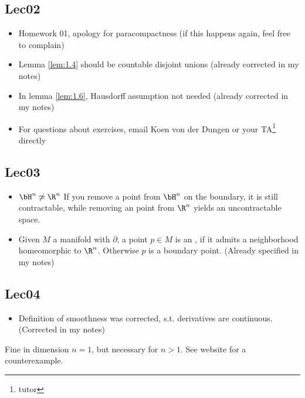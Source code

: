 \subsection*{Lec02}
\begin{itemize}
    \item Homework 01, apology for paracompactness (if this happens again, feel free to complain)
    \item Lemma \ref{lem:1.4} should be countable disjoint unions (already corrected in my notes)
    \item In lemma \ref{lem:1.6}, Hausdorff assumption not needed (already corrected in my notes)
    \item For questions about exercises, email Koen von der Dungen or your TA\footnote{tutor} directly
\end{itemize}

\subsection*{Lec03}

\begin{itemize}
    \item \(\bH^n\not \simeq \R^n\) If you remove a point from \(\bH^n\) on the boundary, it is still contractable, while removing an point from \(\R^n\) yields an uncontractable space.
    \item Given \(M\) a manifold with \(\partial\), a point \(p\in M\) is an , if it admits a neighborhood homeomorphic to \(\R^n\). Otherwise 
          \(p\) is a boundary point. (Already specified in my notes)  
\end{itemize}

\subsection*{Lec04}
\begin{itemize}
    \item Definition of smoothness was corrected, s.t. derivatives are continuous. (Corrected in my notes)
\end{itemize}

\begin{remark}
    Fine in dimension \(n=1\), but necessary for \(n>1\). See website for a counterexample.
\end{remark}